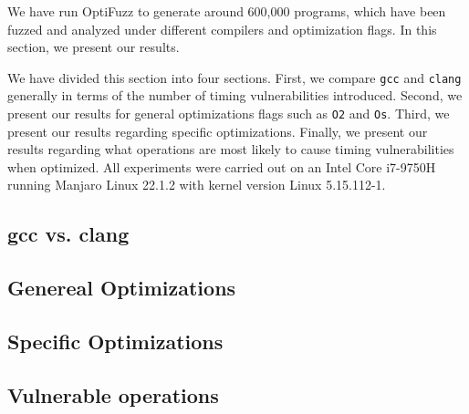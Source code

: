 We have run OptiFuzz to generate around 600,000 programs, which have been fuzzed and analyzed under different compilers and optimization flags.
In this section, we present our results.

We have divided this section into four sections.
First, we compare \texttt{gcc} and \texttt{clang} generally in terms of the number of timing vulnerabilities introduced.
Second, we present our results for general optimizations flags such as \texttt{O2} and \texttt{Os}.
Third, we present our results regarding specific optimizations.
Finally, we present our results regarding what operations are most likely to cause timing vulnerabilities when optimized.
All experiments were carried out on an Intel Core i7-9750H running Manjaro Linux 22.1.2 with kernel version Linux 5.15.112-1.

\subsection{gcc vs. clang}

\subsection{Genereal Optimizations}

\subsection{Specific Optimizations}

\subsection{Vulnerable operations}
